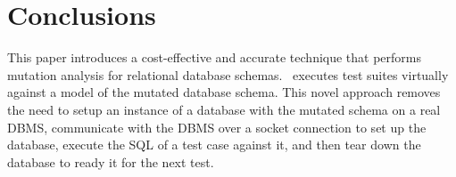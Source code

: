 
\section{Conclusions}
\label{sec:conclusions}


This paper introduces a cost-effective and accurate technique that performs mutation analysis for relational database schemas. \Vma~executes test suites virtually against a model of the mutated database schema. This novel approach removes the need to setup an instance of a database with the mutated schema on a real DBMS, communicate with the DBMS over a socket connection to set up the database, execute the SQL \INSERTs of a test case against it, and then tear down the database to ready it for the next test.


